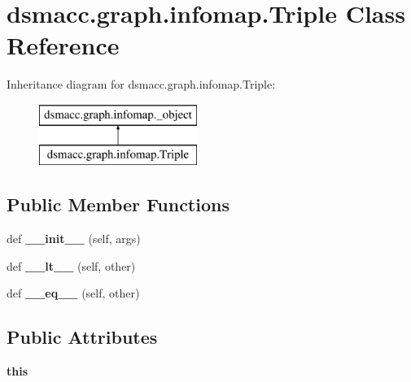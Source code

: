 \hypertarget{classdsmacc_1_1graph_1_1infomap_1_1Triple}{}\section{dsmacc.\+graph.\+infomap.\+Triple Class Reference}
\label{classdsmacc_1_1graph_1_1infomap_1_1Triple}
Inheritance diagram for dsmacc.\+graph.\+infomap.\+Triple\+:\begin{figure}[H]
\begin{center}
\leavevmode
\includegraphics[height=2.000000cm]{classdsmacc_1_1graph_1_1infomap_1_1Triple}
\end{center}
\end{figure}
\subsection*{Public Member Functions}
\begin{DoxyCompactItemize}
\item 
\mbox{\label{classdsmacc_1_1graph_1_1infomap_1_1Triple_a4ecefa72768a9999e1ca2c51a92b6ab3}} 
def {\bfseries \+\_\+\+\_\+init\+\_\+\+\_\+} (self, args)
\item 
\mbox{\label{classdsmacc_1_1graph_1_1infomap_1_1Triple_a3671994295bf92188758268916904166}} 
def {\bfseries \+\_\+\+\_\+lt\+\_\+\+\_\+} (self, other)
\item 
\mbox{\label{classdsmacc_1_1graph_1_1infomap_1_1Triple_a4f54106e9c9830bdadd79eadd5effcaf}} 
def {\bfseries \+\_\+\+\_\+eq\+\_\+\+\_\+} (self, other)
\end{DoxyCompactItemize}
\subsection*{Public Attributes}
\begin{DoxyCompactItemize}
\item 
\mbox{\label{classdsmacc_1_1graph_1_1infomap_1_1Triple_a454731ac536ced6e38ead9f39dc1be74}} 
{\bfseries this}
\end{DoxyCompactItemize}
